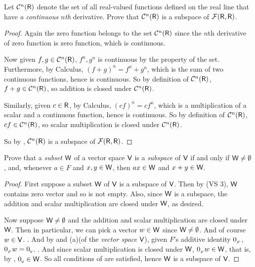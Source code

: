 \begin{exercise} \label{exercise 1.3.16}
Let \(\mathcal{C}^n(\textsf{R})\) denote the set of all real-valued functions defined on the real line that have \emph{a continuous \(n\)th} derivative.
Prove that \(\mathcal{C}^n(\textsf{R})\) is a subspace of \(\mathcal{F}(\textsf{R}, \textsf{R})\).
\end{exercise}

\begin{proof}
Again the zero function belongs to the set \(\mathcal{C}^n(\textsf{R})\) since the \(n\)th derivative of zero function is zero function, which is continuous.

Now given \(f, g \in \mathcal{C}^n(\textsf{R})\), \(f^n, g^n\) is continuous by the property of the set.
Furthermore, by Calculus, \((f + g)^n = f^n + g^n\), which is the sum of two continuous functions, hence is continuous.
So by definition of \(\mathcal{C}^n(\textsf{R})\), \(f + g \in \mathcal{C}^n(\textsf{R})\), so addition is closed under \(\mathcal{C}^n(\textsf{R})\).

Similarly, given \(c \in \textsf{R}\), by Calculus, \((cf)^n = cf^n\), which is a multiplication of a scalar and a continuous function, hence is continuous.
So by definition of \(\mathcal{C}^n(\textsf{R})\), \(cf \in \mathcal{C}^n(\textsf{R})\), so scalar multiplication is closed under \(\mathcal{C}^n(\textsf{R})\).

So by , \(\mathcal{C}^n(\textsf{R})\) is a subspace of \(\mathcal{F}(\textsf{R}, \textsf{R})\).
\end{proof}

\begin{exercise} \label{exercise 1.3.17}
Prove that a \emph{subset} \(\textsf{W}\) of a vector space \(\textsf{V}\) is a \emph{subspace} of \(\textsf{V}\) if and only if \(\textsf{W} \ne \emptyset\), and, whenever \(a \in F\) and \(x, y \in \textsf{W}\), then \(ax \in \textsf{W}\) and \(x + y \in \textsf{W}\).
\end{exercise}

\begin{proof}
First suppose a subset \(\textsf{W}\) of \(\textsf{V}\) is a subspace of \(\textsf{V}\).
Then by (VS 3), \(\textsf{W}\) contains zero vector and so is not empty.
Also, since \(\textsf{W}\) is a subspace, the addition and scalar multiplication are closed under \(\textsf{W}\), as desired.

Now suppose \(\textsf{W} \ne \emptyset\) and the addition and scalar multiplication are closed under \(\textsf{W}\).
Then in particular, we can pick a vector \(w \in \textsf{W}\) since \(\textsf{W} \ne \emptyset\).
And of course \(w \in \textsf{V}\). .
And by  and (a)(of the \emph{vector space} \(\textsf{V}\)), given \(F\)'s additive identity \(0_{_F}\), \(0_{_F} w = 0_{_{\textsf{V}}}\). .
And since scalar multiplication is closed under \(\textsf{W}\), \(0_{_F} w \in \textsf{W}\), that is, by , \(0_{_{\textsf{V}}} \in \textsf{W}\).
So all conditions of  are satisfied, hence \(\textsf{W}\) is a subspace of \(\textsf{V}\).
\end{proof}

